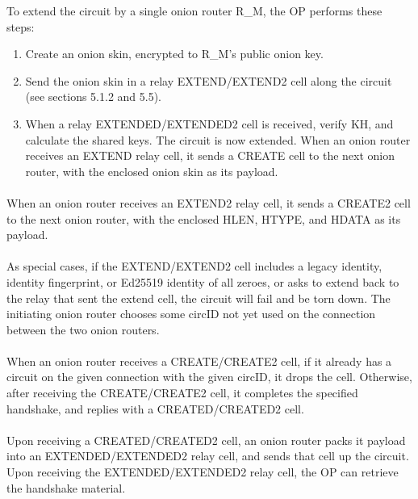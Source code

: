 To extend the circuit by a single onion router R\_M, the OP performs
these steps:
\begin{enumerate}
    \item Create an onion skin, encrypted to R\_M's public onion key.

    \item Send the onion skin in a relay EXTEND/EXTEND2 cell along
    the circuit (see sections 5.1.2 and 5.5).

    \item When a relay EXTENDED/EXTENDED2 cell is received, verify KH,
    and calculate the shared keys. The circuit is now extended.
    When an onion router receives an EXTEND relay cell, it sends a CREATE
    cell to the next onion router, with the enclosed onion skin as its
    payload.
\end{enumerate}

\paragraph{}
When an onion router receives an EXTEND2 relay cell, it sends a CREATE2
cell to the next onion router, with the enclosed HLEN, HTYPE, and HDATA
as its payload.

\paragraph{}
As special cases, if the EXTEND/EXTEND2 cell includes a legacy
identity, identity fingerprint, or Ed25519 identity of all zeroes, or
asks to extend back to the relay that sent the extend cell, the
circuit will fail and be torn down. The initiating onion router
chooses some circID not yet used on the connection between the two
onion routers.

\paragraph{}
When an onion router receives a CREATE/CREATE2 cell, if it already has a
circuit on the given connection with the given circID, it drops the
cell. Otherwise, after receiving the CREATE/CREATE2 cell, it completes
the specified handshake, and replies with a CREATED/CREATED2 cell.

\paragraph{}
Upon receiving a CREATED/CREATED2 cell, an onion router packs it payload
into an EXTENDED/EXTENDED2 relay cell, and sends
that cell up the circuit. Upon receiving the EXTENDED/EXTENDED2 relay
cell, the OP can retrieve the handshake material.

